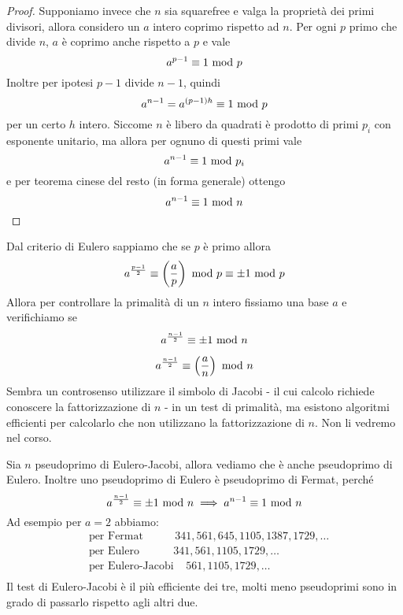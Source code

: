 \begin{proof}
	Supponiamo invece che $n$ sia squarefree e valga la proprietà dei primi divisori, allora considero un $a$ intero coprimo rispetto ad $n$. Per ogni $p$ primo che divide $n$, $a$ è coprimo anche rispetto a $p$ e vale
	\begin{equation*}
	a^{p-1}\equiv1\ \mathrm{mod}\ p
	\end{equation*}
	Inoltre per ipotesi $p-1$ divide $n-1$, quindi 
	\begin{equation*}
	a^{n-1}=a^{(p-1)h}\equiv1\ \mathrm{mod}\ p
	\end{equation*}
	per un certo $h$ intero. Siccome $n$ è libero da quadrati è prodotto di primi $p_i$ con esponente unitario, ma allora per ognuno di questi primi vale 
	\begin{equation*}
	a^{n-1}\equiv1\ \mathrm{mod}\ p_i
	\end{equation*}
	e per teorema cinese del resto (in forma generale) ottengo
	\begin{equation*}
	a^{n-1}\equiv1\ \mathrm{mod}\ n
	\end{equation*}
\end{proof}
\label{lezione10}
\begin{teorema}
	Dal criterio di Eulero sappiamo che se $p$ è primo allora 
	\begin{equation*}
	a^{\frac{p-1}{2}}\equiv\left(\frac{a}{p}\right)\ \mathrm{mod}\ p \equiv\pm1\ \mathrm{mod}\ p 
	\end{equation*}
	Allora per controllare la primalità di un $n$ intero fissiamo una base $a$ e verifichiamo se 
	\begin{equation*}
	a^{\frac{n-1}{2}}\equiv\pm1\ \mathrm{mod}\ n 
	\end{equation*}
\end{teorema}
\begin{teorema}
	\begin{equation*}
	a^{\frac{n-1}{2}}\equiv\left(\frac{a}{n}\right)\ \mathrm{mod}\ n
	\end{equation*}
	Sembra un controsenso utilizzare il simbolo di Jacobi - il cui calcolo richiede conoscere la fattorizzazione di $n$ - in un test di primalità, ma esistono algoritmi efficienti per calcolarlo che non utilizzano la fattorizzazione di $n$. Non li vedremo nel corso.
\end{teorema}
\begin{osservazione}
	Sia $n$ pseudoprimo di Eulero-Jacobi, allora vediamo che è anche pseudoprimo di Eulero. Inoltre uno pseudoprimo di Eulero è pseudoprimo di Fermat, perché
	\begin{equation*}
	a^{\frac{n-1}{2}} \equiv\pm1\ \mathrm{mod}\ n \implies a^{n-1} \equiv1\ \mathrm{mod}\ n
	\end{equation*}
	Ad esempio per $a=2$ abbiamo:
	\begin{align*}
	&\text{per Fermat} \ \ \ \ \ \ \ \ \ \ \ \ \ 341,561,645,1105,1387,1729,\dots\\
	&\text{per Eulero} \ \ \ \ \ \ \ \ \ \ \ \ \ \  341,561,1105,1729,\dots\\
	&\text{per Eulero-Jacobi} \ \ \ \ \ 561,1105,1729,\dots\\
	\end{align*}
	Il test di Eulero-Jacobi è il più efficiente dei tre, molti meno pseudoprimi sono in grado di passarlo rispetto agli altri due.
\end{osservazione}
